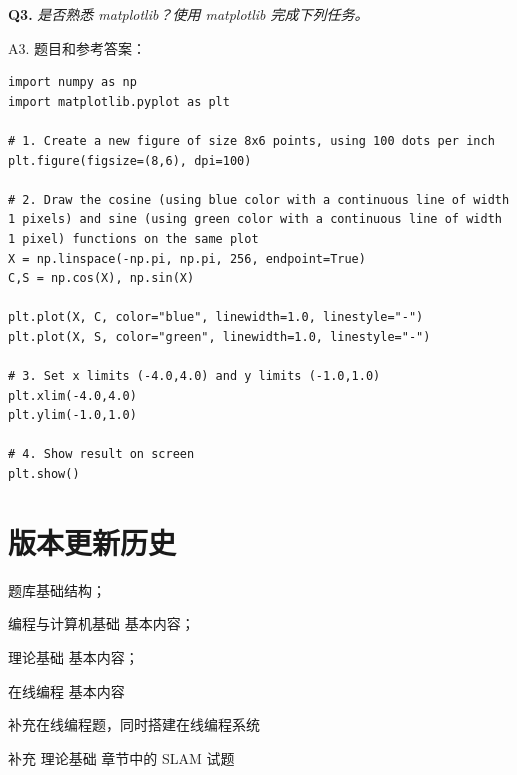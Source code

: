 \documentclass[cn,10pt,math=newtx,citestyle=gb7714-2015,bibstyle=gb7714-2015]{elegantbook}
\begin{document}
\textbf{Q3.} \textit{是否熟悉 matplotlib？使用 matplotlib 完成下列任务。}

A3. 题目和参考答案：


\begin{lstlisting}
import numpy as np
import matplotlib.pyplot as plt

# 1. Create a new figure of size 8x6 points, using 100 dots per inch
plt.figure(figsize=(8,6), dpi=100)

# 2. Draw the cosine (using blue color with a continuous line of width 1 pixels) and sine (using green color with a continuous line of width 1 pixel) functions on the same plot
X = np.linspace(-np.pi, np.pi, 256, endpoint=True)
C,S = np.cos(X), np.sin(X)

plt.plot(X, C, color="blue", linewidth=1.0, linestyle="-")
plt.plot(X, S, color="green", linewidth=1.0, linestyle="-")

# 3. Set x limits (-4.0,4.0) and y limits (-1.0,1.0)
plt.xlim(-4.0,4.0)
plt.ylim(-1.0,1.0)

# 4. Show result on screen
plt.show()
\end{lstlisting}

\newpage

\chapter{版本更新历史}


\begin{change}
  \item 题库基础结构；
  \item 编程与计算机基础 基本内容；
  \item 理论基础 基本内容；
  \item 在线编程 基本内容
\end{change}


\begin{change}
  \item 补充在线编程题，同时搭建在线编程系统
\end{change}



\begin{change}
  \item 补充 理论基础 章节中的 SLAM 试题
\end{change}
\end{document}

